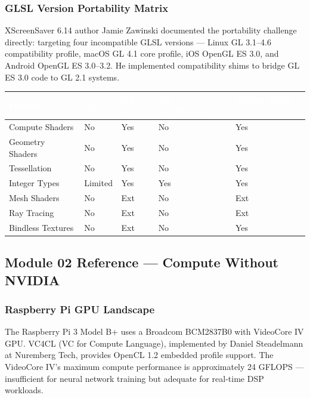 \documentclass[11pt,letterpaper]{article}
\newcommand{\tableheader}[1]{\textbf{\sffamily\textcolor{white}{#1}}}
\begin{document}
\subsubsection{GLSL Version Portability Matrix}

XScreenSaver 6.14 author Jamie Zawinski documented the portability challenge directly: targeting four incompatible GLSL versions — Linux GL 3.1--4.6 compatibility profile, macOS GL 4.1 core profile, iOS OpenGL ES 3.0, and Android OpenGL ES 3.0--3.2. He implemented compatibility shims to bridge GL ES 3.0 code to GL 2.1 systems.

\begin{center}
\begin{tabularx}{\textwidth}{L{3cm}C{2cm}C{2cm}C{2.5cm}C{2.5cm}}
\toprule
{}
\tableheader{Feature} & \tableheader{GL 2.1} & \tableheader{GL 4.6} & \tableheader{ES 3.0/WebGL2} & \tableheader{Vulkan SPIR-V} \\
\midrule
Compute Shaders & No & Yes & No & Yes \\
Geometry Shaders & No & Yes & No & Yes \\
Tessellation & No & Yes & No & Yes \\
Integer Types & Limited & Yes & Yes & Yes \\
Mesh Shaders & No & Ext & No & Ext \\
Ray Tracing & No & Ext & No & Ext \\
Bindless Textures & No & Ext & No & Yes \\
\bottomrule
\end{tabularx}
\end{center}

\subsection{Module 02 Reference --- Compute Without NVIDIA}

\subsubsection{Raspberry Pi GPU Landscape}

The Raspberry Pi 3 Model B+ uses a Broadcom BCM2837B0 with VideoCore IV GPU. VC4CL (VC for Compute Language), implemented by Daniel Steadelmann at Nuremberg Tech, provides OpenCL 1.2 embedded profile support. The VideoCore IV's maximum compute performance is approximately 24 GFLOPS — insufficient for neural network training but adequate for real-time DSP workloads.
\end{document}
